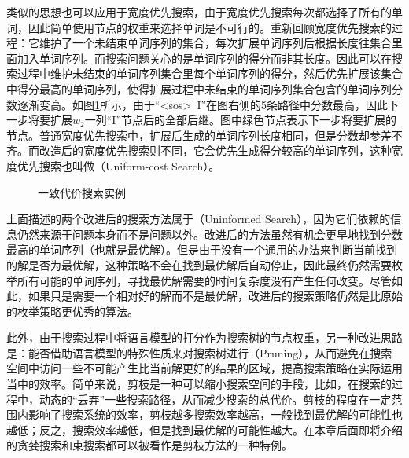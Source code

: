 \parinterval 类似的思想也可以应用于宽度优先搜索，由于宽度优先搜索每次都选择了所有的单词，因此简单使用节点的权重来选择单词是不可行的。重新回顾宽度优先搜索的过程：它维护了一个未结束单词序列的集合，每次扩展单词序列后根据长度往集合里面加入单词序列。而搜索问题关心的是单词序列的得分而非其长度。因此可以在搜索过程中维护未结束的单词序列集合里每个单词序列的得分，然后优先扩展该集合中得分最高的单词序列，使得扩展过程中未结束的单词序列集合包含的单词序列分数逐渐变高。如图\ref{fig:2-17}所示，由于“<sos>\ I”在图右侧的5条路径中分数最高，因此下一步将要扩展$w_2$一列“I”节点后的全部后继。图中绿色节点表示下一步将要扩展的节点。普通宽度优先搜索中，扩展后生成的单词序列长度相同，但是分数却参差不齐。而改造后的宽度优先搜索则不同，它会优先生成得分较高的单词序列，这种宽度优先搜索也叫做{\small{}}（Uniform-cost Search）。

\begin{figure}[htp]
    \centering
 	
	\caption{一致代价搜索实例}
    \label{fig:2-17}
\end{figure}

\parinterval 上面描述的两个改进后的搜索方法属于{\small{}}（Uninformed Search），因为它们依赖的信息仍然来源于问题本身而不是问题以外。改进后的方法虽然有机会更早地找到分数最高的单词序列（也就是最优解）。但是由于没有一个通用的办法来判断当前找到的解是否为最优解，这种策略不会在找到最优解后自动停止，因此最终仍然需要枚举所有可能的单词序列，寻找最优解需要的时间复杂度没有产生任何改变。尽管如此，如果只是需要一个相对好的解而不是最优解，改进后的搜索策略仍然是比原始的枚举策略更优秀的算法。

\parinterval 此外，由于搜索过程中将语言模型的打分作为搜索树的节点权重，另一种改进思路是：能否借助语言模型的特殊性质来对搜索树进行{\small{}}（Pruning），从而避免在搜索空间中访问一些不可能产生比当前解更好的结果的区域，提高搜索策略在实际运用当中的效率。简单来说，剪枝是一种可以缩小搜索空间的手段，比如，在搜索的过程中，动态的“丢弃”一些搜索路径，从而减少搜索的总代价。剪枝的程度在一定范围内影响了搜索系统的效率，剪枝越多搜索效率越高，一般找到最优解的可能性也越低；反之，搜索效率越低，但是找到最优解的可能性越大。在本章后面即将介绍的贪婪搜索和束搜索都可以被看作是剪枝方法的一种特例。


